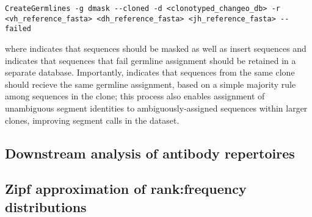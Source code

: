 \begin{lstlisting}
CreateGermlines -g dmask --cloned -d <clonotyped_changeo_db> -r <vh_reference_fasta> <dh_reference_fasta> <jh_reference_fasta> --failed
\end{lstlisting}

where  indicates that \dh sequences should be masked as well as insert sequences and  indicates that sequences that fail germline assignment should be retained in a separate database. Importantly,  indicates that sequences from the same clone should recieve the same germline assignment, based on a simple majority rule among sequences in the clone; this process also enables assignment of unambiguous segment identities to ambiguously-assigned sequences within larger clones, improving segment calls in the dataset.

%



\subsection{Downstream analysis of antibody repertoires}
\label{sec:methods_comp_igdownstream}


\subsection{Zipf approximation of rank:frequency distributions}
\label{sec:methods_comp_igdownstream_zipf}
